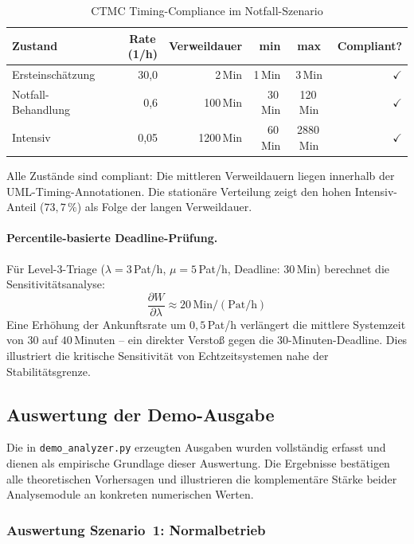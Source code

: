﻿\documentclass[a4paper,12pt]{scrreprt}
\theoremstyle{definition}
\begin{document}
\begin{table}[H]
	\centering
	\begin{tabular}{@{}lrrrcr@{}}
		\toprule
		\textbf{Zustand} & \textbf{Rate}\,(1/h) & \textbf{Verweildauer} &
		\textbf{min} & \textbf{max} & \textbf{Compliant?} \\
		\midrule
		Ersteinschätzung  &  30{,}0 &  2\,Min &  1\,Min &   3\,Min & $\checkmark$ \\
		Notfall-Behandlung &  0{,}6 & 100\,Min & 30\,Min & 120\,Min & $\checkmark$ \\
		Intensiv           & 0{,}05 & 1200\,Min & 60\,Min & 2880\,Min& $\checkmark$ \\
		\bottomrule
	\end{tabular}
	\caption{CTMC Timing-Compliance im Notfall-Szenario}
	\label{tab:ctmc-compliance}
\end{table}

Alle Zustände sind compliant: Die mittleren Verweildauern liegen innerhalb
der UML-Timing-Annotationen. Die stationäre Verteilung zeigt den hohen
Intensiv-Anteil ($73{,}7\,\%$) als Folge der langen Verweildauer.

\paragraph{Percentile-basierte Deadline-Prüfung.}
Für Level-3-Triage ($\lambda = 3$\,Pat/h, $\mu = 5$\,Pat/h,
Deadline: 30\,Min) berechnet die Sensitivitätsanalyse:
\begin{equation}
	\frac{\partial W}{\partial \lambda} \approx 20\,\text{Min}/(\text{Pat/h})
\end{equation}
Eine Erhöhung der Ankunftsrate um $0{,}5$\,Pat/h verlängert die
mittlere Systemzeit von $30$ auf $40$\,Minuten -- ein direkter Verstoß
gegen die 30-Minuten-Deadline. Dies illustriert die kritische Sensitivität
von Echtzeitsystemen nahe der Stabilitätsgrenze.

\subsection{Auswertung der Demo-Ausgabe}
\label{sec:demo-auswertung}

Die in \texttt{demo\_analyzer.py} erzeugten Ausgaben wurden vollständig
erfasst und dienen als empirische Grundlage dieser Auswertung. Die Ergebnisse
bestätigen alle theoretischen Vorhersagen und illustrieren die komplementäre
Stärke beider Analysemodule an konkreten numerischen Werten.

\subsubsection{Auswertung Szenario~1: Normalbetrieb}
\end{document}
